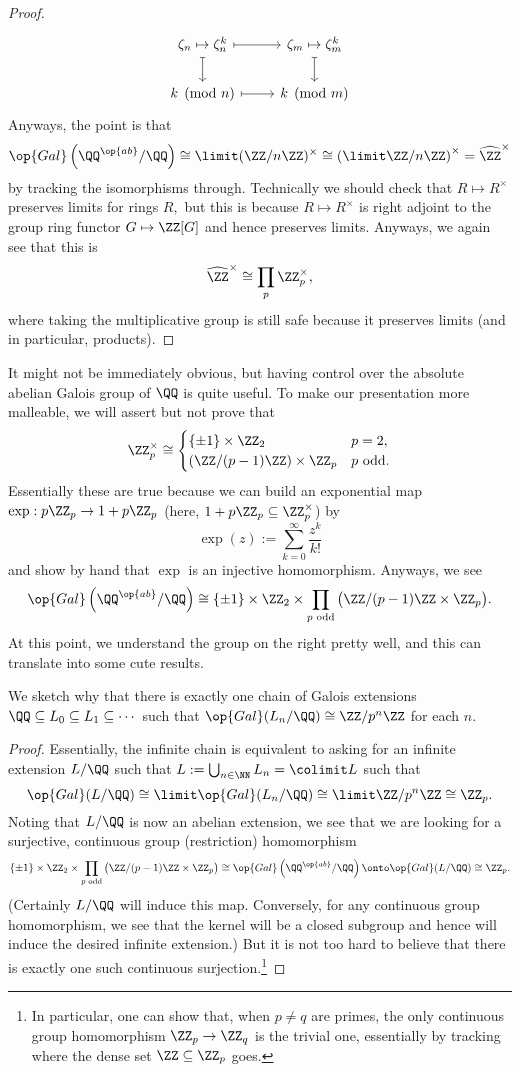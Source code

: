 \begin{proof}
	\[\begin{tikzcd}
		{\zeta_n\mapsto\zeta_n^k} & {\zeta_m\mapsto\zeta_m^k} \\
		{k\pmod n} & {k\pmod m}
		\arrow[maps to, from=1-1, to=2-1]
		\arrow[maps to, from=1-1, to=1-2]
		\arrow[maps to, from=1-2, to=2-2]
		\arrow[maps to, from=2-1, to=2-2]
	\end{tikzcd}\]
	Anyways, the point is that
	\[\op{Gal}\left(\QQ^{\op{ab}}/\QQ\right)\cong\limit(\ZZ/n\ZZ)^\times\cong\left(\limit\ZZ/n\ZZ\right)^\times=\widehat{\ZZ}^\times\]
	by tracking the isomorphisms through. Technically we should check that $R\mapsto R^\times$ preserves limits for rings $R,$ but this is because $R\mapsto R^\times$ is right adjoint to the group ring functor $G\mapsto\ZZ[G]$ and hence preserves limits. Anyways, we again see that this is
	\[\widehat{\ZZ}^\times\cong\prod_p\ZZ_p^\times,\]
	where taking the multiplicative group is still safe because it preserves limits (and in particular, products).
\end{proof}
It might not be immediately obvious, but having control over the absolute abelian Galois group of $\QQ$ is quite useful. To make our presentation more malleable, we will assert but not prove that
\[\ZZ_p^\times\cong\begin{cases}
	\{\pm1\}\times\ZZ_2 & p=2, \\
	(\ZZ/(p-1)\ZZ)\times\ZZ_p & p\text{ odd}.
\end{cases}\]
Essentially these are true because we can build an exponential map $\exp:p\ZZ_p\to1+p\ZZ_p$ (here, $1+p\ZZ_p\subseteq\ZZ_p^\times$) by
\[\exp(z):=\sum_{k=0}^\infty\frac{z^k}{k!}\]
and show by hand that $\exp$ is an injective homomorphism. Anyways, we see
\[\op{Gal}\left(\QQ^{\op{ab}}/\QQ\right)\cong\{\pm1\}\times\ZZ_2\times\prod_{p\text{ odd}}\big(\ZZ/(p-1)\ZZ\times\ZZ_p\big).\]
At this point, we understand the group on the right pretty well, and this can translate into some cute results.
\begin{exe}
	We sketch why that there is exactly one chain of Galois extensions $\QQ\subseteq L_0\subseteq L_1\subseteq\cdots$ such that $\op{Gal}(L_n/\QQ)\cong\ZZ/p^n\ZZ$ for each $n.$
\end{exe}
\begin{proof}
	Essentially, the infinite chain is equivalent to asking for an infinite extension $L/\QQ$ such that $L:=\bigcup_{n\in\NN}L_n=\colimit L$ such that
	\[\op{Gal}(L/\QQ)\cong\limit\op{Gal}(L_n/\QQ)\cong\limit\ZZ/p^n\ZZ\cong\ZZ_p.\]
	Noting that $L/\QQ$ is now an abelian extension, we see that we are looking for a surjective, continuous group (restriction) homomorphism
	\[\{\pm1\}\times\ZZ_2\times\prod_{p\text{ odd}}\big(\ZZ/(p-1)\ZZ\times\ZZ_p\big)\cong\op{Gal}\left(\QQ^{\op{ab}}/\QQ\right)\onto\op{Gal}(L/\QQ)\cong\ZZ_p.\]
	(Certainly $L/\QQ$ will induce this map. Conversely, for any continuous group homomorphism, we see that the kernel will be a closed subgroup and hence will induce the desired infinite extension.) But it is not too hard to believe that there is exactly one such continuous surjection.\footnote{In particular, one can show that, when $p\ne q$ are primes, the only continuous group homomorphism $\ZZ_p\to\ZZ_q$ is the trivial one, essentially by tracking where the dense set $\ZZ\subseteq\ZZ_p$ goes.}
\end{proof}
